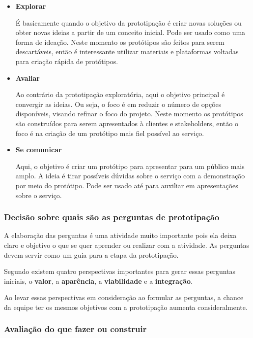 \begin{itemize}
	\item \textbf{Explorar}
	
	É basicamente quando o objetivo da prototipação é criar novas soluções ou obter novas ideias a partir de um conceito inicial. Pode ser usado como uma forma de ideação. Neste momento os protótipos são feitos para serem descartáveis, então é interessante utilizar materiais e plataformas voltadas para criação rápida de protótipos.
	
	\item \textbf{Avaliar}
	
	Ao contrário da prototipação exploratória, aqui o objetivo principal é convergir as ideias. Ou seja, o foco é em reduzir o número de opções disponíveis, visando refinar o foco do projeto. Neste momento os protótipos são construídos para serem apresentados à clientes e stakeholders, então o foco é na criação de um protótipo mais fiel possível ao serviço.
	
	\item \textbf{Se comunicar}
	
	Aqui, o objetivo é criar um protótipo para apresentar para um público mais amplo. A ideia é tirar possíveis dúvidas sobre o serviço com a demonstração por meio do protótipo. Pode ser usado até para auxiliar em apresentações sobre o serviço.
	
\end{itemize}

\subsubsection{Decisão sobre quais são as perguntas de prototipação}

A elaboração das perguntas é uma atividade muito importante pois ela deixa claro e objetivo o que se quer aprender ou realizar com a atividade. As perguntas devem servir como um guia para a etapa da prototipação.

Segundo \cite{Stickdorn2019} existem quatro perspectivas importantes para gerar essas perguntas iniciais, o \textbf{valor}, a \textbf{aparência}, a \textbf{viabilidade} e a \textbf{integração}. 

Ao levar essas perspectivas em consideração ao formular as perguntas, a chance da equipe ter os mesmos objetivos com a prototipação aumenta consideralmente.

\subsubsection{Avaliação do que fazer ou construir}

